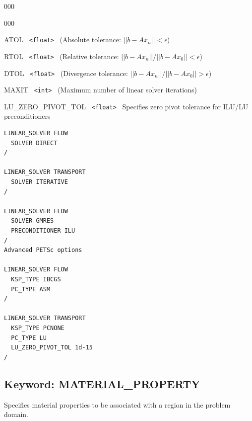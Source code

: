 \documentclass[12pt]{article}
\begin{document}
\begin{deflist}{000}
\begin{deflist}{000}
\item[ATOL] \ {\tt <float>} \ (Absolute tolerance: $||b-Ax_n|| < \epsilon$)
\item[RTOL] \ {\tt <float>} \ (Relative tolerance: $||b-Ax_n||/||b-Ax_0||<\epsilon$)
\item[DTOL] \ {\tt <float>} \ (Divergence tolerance: $||b-Ax_n||/||b-Ax_0||>\epsilon$)
\item[MAXIT] \ {\tt <int>} \ (Maximum number of linear solver iterations)
\item[LU\_ZERO\_PIVOT\_TOL] \ {\tt <float>} \
Specifies zero pivot tolerance for ILU/LU preconditioners


\end{deflist}
\item[\keyend]
\end{deflist}


\begin{mdframed}

\begin{verbatim}
LINEAR_SOLVER FLOW
  SOLVER DIRECT
/

LINEAR_SOLVER TRANSPORT
  SOLVER ITERATIVE
/

LINEAR_SOLVER FLOW
  SOLVER GMRES
  PRECONDITIONER ILU
/
Advanced PETSc options

LINEAR_SOLVER FLOW
  KSP_TYPE IBCGS
  PC_TYPE ASM
/

LINEAR_SOLVER TRANSPORT
  KSP_TYPE PCNONE
  PC_TYPE LU
  LU_ZERO_PIVOT_TOL 1d-15
/
\end{verbatim}
\end{mdframed}

\hyperlink{target_key}{\return}


\newpage
\protect\hypertarget{target_mat}{}

\subsection{Keyword: MATERIAL\_PROPERTY}

 Specifies material properties to be associated with a region in the problem domain.
\end{document}
